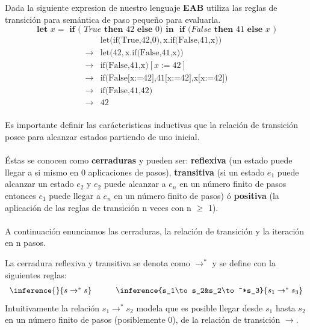     \begin{exercise}
        Dada la siguiente expresion de nuestro lenguaje \textbf{EAB} utiliza las reglas de transición para semántica de paso pequeño para evaluarla.
        \[
            \textbf{let } x = \textbf{ if ( } True \textbf{ then } 42 \textbf{ else } 0 \textbf{)} \textbf{ in } \textbf{ if (} False \textbf{ then } 41 \textbf{ else } x \textbf{ )}
        \]  
        \[
            \begin{array}{cl}
                &\text{let}(\text{if(True,42,0)},\text{x}.\text{if(False,41,x))}\\
                \to&\text{let}(\text{42},\text{x}.\text{if(False,41,x))}\\
                \to&\text{if(False,41,x)}[x:=42]\\
                \to&\text{if(False[x:=42],41[x:=42],x[x:=42])}\\
                \to&\text{if(False,41,42)}\\
                \to&42\\
            \end{array}
        \]
    \end{exercise}

    Es importante definir las carácteristicas inductivas que la relación de transición posee para alcanzar estados partiendo de uno inicial. \\\\
    Éstas se conocen como \textbf{cerraduras} y pueden ser:  \textbf{reflexiva} (un estado puede llegar a si mismo en 0 aplicaciones de pasos), \textbf{transitiva} (si un estado $e_1$ puede alcanzar un estado $e_2$ y $e_2$ puede alcanzar a $e_n$ en un número finito de pasos entonces $e_1$ puede llegar a $e_n$ en un número finito de pasos) ó \textbf{positiva} (la aplicación de las reglas de transición n veces con n $\geq$ 1).\\\\
    A continuación enunciamos las cerraduras, la relación de transición y la iteración en n pasos.

    \begin{definition} La cerradura reflexiva y transitiva se denota como $\to^*$ y se define con la siguientes reglas:
        \[
            \begin{array}{ccc}
                \inference{}{s\to^*s}&
                \quad&
                \inference{s_1\to s_2&s_2\to^*s_3}{s_1\to^*s_3}
            \end{array}
        \]
        Intuitivamente la relación $s_1\to^*s_2$ modela que es posible llegar desde $s_1$ hasta $s_2$ en un número finito de pasos (posiblemente 0), de la relación de transición $\to$.
    \end{definition}
    
